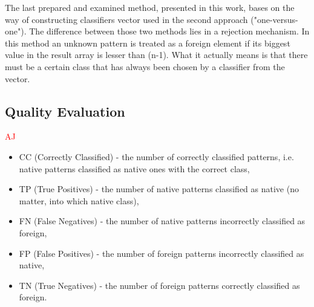 \documentclass{llncs}
\begin{document}
The last prepared and examined method, presented in this work, bases on the way of constructing classifiers vector used in the second approach ("one-versus-one"). The difference between those two methods lies in a rejection mechanism. In this method an unknown pattern is treated as a foreign element if its biggest value in the result array is lesser than (n-1). What it actually means is that there must be a certain class that has always been chosen by a classifier from the vector.




\subsection{Quality Evaluation}
\textcolor{red} {AJ}
\begin{itemize}
\item CC  (Correctly Classified) - the number of correctly classified patterns, i.e. native patterns classified as native ones with the correct class, %
\item TP  (True Positives) - the number of native patterns classified as native (no matter, into which native class),
\item FN  (False Negatives) - the number of native patterns incorrectly classified as foreign,
\item FP  (False Positives) - the number of foreign patterns incorrectly classified as native,
\item TN  (True Negatives) - the number of foreign patterns correctly classified as foreign.
\end{itemize}
\end{document}
